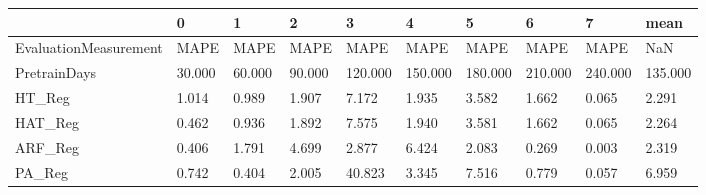 \begin{tabular}{llllllllll}
\toprule
{} &      0 &      1 &      2 &       3 &       4 &       5 &       6 &       7 &    mean \\
\midrule
EvaluationMeasurement &   MAPE &   MAPE &   MAPE &    MAPE &    MAPE &    MAPE &    MAPE &    MAPE &     NaN \\
PretrainDays          & 30.000 & 60.000 & 90.000 & 120.000 & 150.000 & 180.000 & 210.000 & 240.000 & 135.000 \\
HT\_Reg                &  1.014 &  0.989 &  1.907 &   7.172 &   1.935 &   3.582 &   1.662 &   0.065 &   2.291 \\
HAT\_Reg               &  0.462 &  0.936 &  1.892 &   7.575 &   1.940 &   3.581 &   1.662 &   0.065 &   2.264 \\
ARF\_Reg               &  0.406 &  1.791 &  4.699 &   2.877 &   6.424 &   2.083 &   0.269 &   0.003 &   2.319 \\
PA\_Reg                &  0.742 &  0.404 &  2.005 &  40.823 &   3.345 &   7.516 &   0.779 &   0.057 &   6.959 \\
\bottomrule
\end{tabular}
